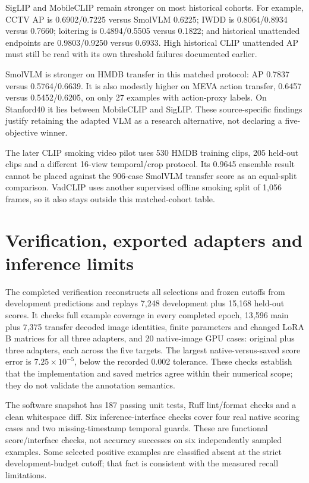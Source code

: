 SigLIP and MobileCLIP remain stronger on most historical cohorts. For example, CCTV AP is 0.6902/0.7225 versus SmolVLM 0.6225; IWDD is 0.8064/0.8934 versus 0.7660; loitering is 0.4894/0.5505 versus 0.1822; and historical unattended endpoints are 0.9803/0.9250 versus 0.6933. High historical CLIP unattended AP must still be read with its own threshold failures documented earlier.

SmolVLM is stronger on HMDB transfer in this matched protocol: AP 0.7837 versus 0.5764/0.6639. It is also modestly higher on MEVA action transfer, 0.6457 versus 0.5452/0.6205, on only 27 examples with action-proxy labels. On Stanford40 it lies between MobileCLIP and SigLIP. These source-specific findings justify retaining the adapted VLM as a research alternative, not declaring a five-objective winner.

The later CLIP smoking video pilot uses 530 HMDB training clips, 205 held-out clips and a different 16-view temporal/crop protocol. Its 0.9645 ensemble result cannot be placed against the 906-case SmolVLM transfer score as an equal-split comparison. VadCLIP uses another supervised offline smoking split of 1,056 frames, so it also stays outside this matched-cohort table.


\section{Verification, exported adapters and inference limits}
The completed verification reconstructs all selections and frozen cutoffs from development predictions and replays 7,248 development plus 15,168 held-out scores. It checks full example coverage in every completed epoch, 13,596 main plus 7,375 transfer decoded image identities, finite parameters and changed LoRA B matrices for all three adapters, and 20 native-image GPU cases: original plus three adapters, each across the five targets. The largest native-versus-saved score error is $7.25\times10^{-5}$, below the recorded 0.002 tolerance. These checks establish that the implementation and saved metrics agree within their numerical scope; they do not validate the annotation semantics.

The software snapshot has 187 passing unit tests, Ruff lint/format checks and a clean whitespace diff. Six inference-interface checks cover four real native scoring cases and two missing-timestamp temporal guards. These are functional score/interface checks, not accuracy successes on six independently sampled examples. Some selected positive examples are classified absent at the strict development-budget cutoff; that fact is consistent with the measured recall limitations.

